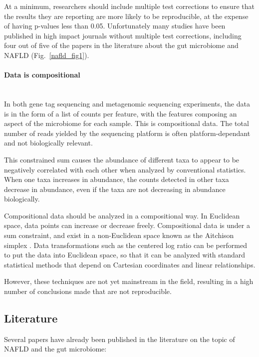 At a minimum, researchers should include multiple test corrections to ensure that the results they are reporting are more likely to be reproducible, at the expense of having p-values less than 0.05. Unfortunately many studies have been published in high impact journals without multiple test corrections, including four out of five of the papers in the literature about the gut microbiome and NAFLD (Fig.~\ref{nafld_fig1}).

\paragraph{Data is compositional}\mbox{}\\
In both gene tag sequencing and metagenomic sequencing experiments, the data is in the form of a list of counts per feature, with the features composing an aspect of the microbiome for each sample. This is compositional data. The total number of reads yielded by the sequencing platform is often platform-dependant and not biologically relevant.

This constrained sum causes the abundance of different taxa to appear to be negatively correlated with each other when analyzed by conventional statistics. When one taxa increases in abundance, the counts detected in other taxa decrease in abundance, even if the taxa are not decreasing in abundance biologically.

Compositional data should be analyzed in a compositional way. In Euclidean space, data points can increase or decrease freely. Compositional data is under a sum constraint, and exist in a non-Euclidean space known as the Aitchison simplex \cite{aitchison1982statistical}. Data transformations such as the centered log ratio can be performed to put the data into Euclidean space, so that it can be analyzed with standard statistical methods that depend on Cartesian coordinates and linear relationships.

However, these techniques are not yet mainstream in the field, resulting in a high number of conclusions made that are not reproducible.

\subsection{Literature}
Several papers have already been published in the literature on the topic of NAFLD and the gut microbiome:

